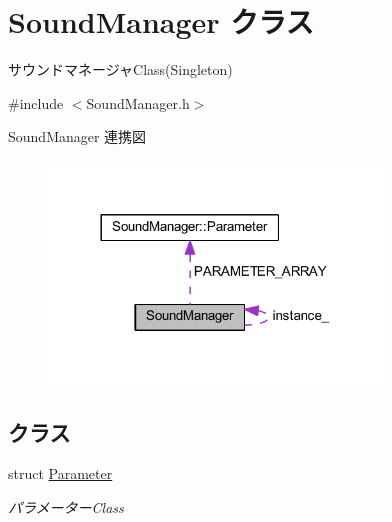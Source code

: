 \hypertarget{class_sound_manager}{}\section{Sound\+Manager クラス}
\label{class_sound_manager}


サウンドマネージャ\+Class(\+Singleton)  




{\ttfamily \#include $<$Sound\+Manager.\+h$>$}



Sound\+Manager 連携図\nopagebreak
\begin{figure}[H]
\begin{center}
\leavevmode
\includegraphics[width=252pt]{class_sound_manager__coll__graph}
\end{center}
\end{figure}
\subsection*{クラス}
\begin{DoxyCompactItemize}
\item 
struct \mbox{\hyperlink{struct_sound_manager_1_1_parameter}{Parameter}}
\begin{DoxyCompactList}\small\item\em パラメーター\+Class \end{DoxyCompactList}\end{DoxyCompactItemize}
